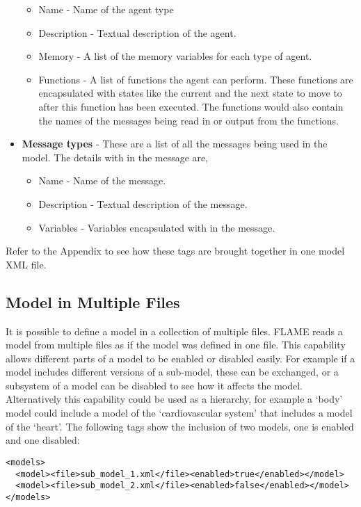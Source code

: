 \begin{itemize}
\begin{itemize}
\item Name - Name of the agent type
\item Description - Textual description of the agent.
\item Memory - A list of the memory variables for each type of agent.
\item Functions - A list of functions the agent can perform. These functions are encapsulated with states like the current and the next state to move to after this function has been executed. The functions would also contain the names of the messages being read in or output from the functions.
\end{itemize}
\item \textbf{Message types} - These are a list of all the messages being used in the
model. The details with in the message are,
\begin{itemize}
\item Name - Name of the message.
\item Description - Textual description of the message.
\item Variables - Variables encapsulated with in the message.
\end{itemize}
\end{itemize}

Refer to the Appendix to see how these tags are brought together in
one model XML file.

\subsection{Model in Multiple Files}

It is possible to define a model in a collection of multiple files. FLAME reads a model from
multiple files as if the model was defined in one file. This capability allows
different parts of a model to be enabled or disabled easily. For example if a
model includes different versions of a sub-model, these can be exchanged, or a
subsystem of a model can be disabled to see how it affects the model.
Alternatively this capability could be used as a hierarchy, for example a `body'
model could include a model of the `cardiovascular system' that includes a
model of the `heart'. The following tags show the inclusion of two models, one is
enabled and one disabled:

\begin{mylisting}
\begin{verbatim}
<models>
  <model><file>sub_model_1.xml</file><enabled>true</enabled></model>
  <model><file>sub_model_2.xml</file><enabled>false</enabled></model>
</models>
\end{verbatim}
\end{mylisting}


